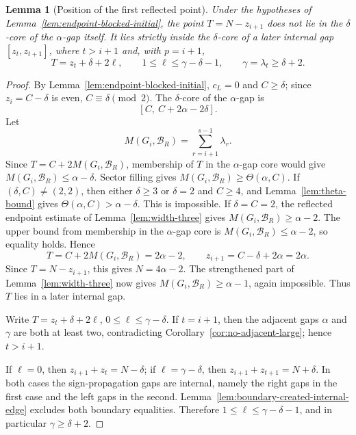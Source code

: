 \documentclass[11pt]{article}
\newtheorem{lemma}[theorem]{Lemma}
\begin{document}
\begin{lemma}[Position of the first reflected point]\label{lem:endpoint-blocked-position}
Under the hypotheses of Lemma~\ref{lem:endpoint-blocked-initial}, the point $T=N-z_{i+1}$ does not lie in the $\delta$-core of the $\alpha$-gap itself.  It lies strictly inside the $\delta$-core of a later internal gap $[z_t,z_{t+1}]$, where $t>i+1$ and, with $p=i+1$,
\[
        T=z_t+\delta+2\ell,
        \qquad
        1\le \ell\le \gamma-\delta-1,
        \qquad
        \gamma=\lambda_t\ge\delta+2.
\]
\end{lemma}

\begin{proof}
By Lemma~\ref{lem:endpoint-blocked-initial}, $c_L=0$ and $C\ge\delta$; since $z_i=C-\delta$ is even, $C\equiv\delta\pmod2$.  The $\delta$-core of the $\alpha$-gap is
\[
        [C,\ C+2\alpha-2\delta].
\]
Let
\[
        M(G_i,\mathcal B_R)=\sum_{r=i+1}^{s-1}\lambda_r.
\]
Since $T=C+2M(G_i,\mathcal B_R)$, membership of $T$ in the $\alpha$-gap core would give $M(G_i,\mathcal B_R)\le \alpha-\delta$.  Sector filling gives $M(G_i,\mathcal B_R)\ge\Theta(\alpha,C)$.  If $(\delta,C)\ne(2,2)$, then either $\delta\ge3$ or $\delta=2$ and $C\ge4$, and Lemma~\ref{lem:theta-bound} gives $\Theta(\alpha,C)>\alpha-\delta$.  This is impossible.  If $\delta=C=2$, the reflected endpoint estimate of Lemma~\ref{lem:width-three} gives $M(G_i,\mathcal B_R)\ge\alpha-2$.  The upper bound from membership in the $\alpha$-gap core is $M(G_i,\mathcal B_R)\le\alpha-2$, so equality holds.  Hence
\[
        T=C+2M(G_i,\mathcal B_R)=2\alpha-2,
        \qquad
        z_{i+1}=C-\delta+2\alpha=2\alpha.
\]
Since $T=N-z_{i+1}$, this gives $N=4\alpha-2$.  The strengthened part of Lemma~\ref{lem:width-three} now gives $M(G_i,\mathcal B_R)\ge\alpha-1$, again impossible.  Thus $T$ lies in a later internal gap.

Write $T=z_t+\delta+2\ell$, $0\le\ell\le\gamma-\delta$.  If $t=i+1$, then the adjacent gaps $\alpha$ and $\gamma$ are both at least two, contradicting Corollary~\ref{cor:no-adjacent-large}; hence $t>i+1$.

If $\ell=0$, then $z_{i+1}+z_t=N-\delta$; if $\ell=\gamma-\delta$, then $z_{i+1}+z_{t+1}=N+\delta$.  In both cases the sign-propagation gaps are internal, namely the right gaps in the first case and the left gaps in the second.  Lemma~\ref{lem:boundary-created-internal-edge} excludes both boundary equalities.  Therefore $1\le\ell\le\gamma-\delta-1$, and in particular $\gamma\ge\delta+2$.
\end{proof}
\end{document}
